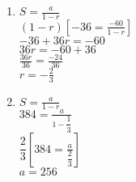 \begin{enumerate}[label = \Alph*. ]
\begin{multicols}{2}
\begin{enumerate}[label = \arabic*. ]
\item %

$S = \displaystyle\frac{a}{1-r}$\\

$(1-r)\left[-36 = \displaystyle\frac{-60}{1-r}\right] $\\

$-36+36r = -60$\\
$36r = -60+36$\\
$\displaystyle \frac{36r}{36}  = \displaystyle \frac{-24}{36} $\\
$r = \displaystyle -\frac{2}{3} $

\item %

$S = \displaystyle\frac{a}{1-r}$\\
$384 = \displaystyle\frac{a}{1-\dfrac{1}{3}}$\\
$\dfrac{2}{3}\left[ 384 = \displaystyle\frac{a}{\dfrac{2}{3}}\right] $\\

$a = 256  $
%	
\end{enumerate}

\end{multicols} 
\end{enumerate}




